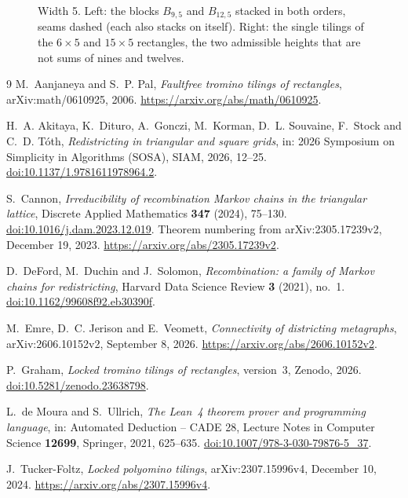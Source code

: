 \documentclass[11pt]{article}
\theoremstyle{definition}
\theoremstyle{remark}
\begin{document}
\begin{appendices}
\begin{figure}[ht]
\caption{Width 5. Left: the blocks $B_{9,5}$ and $B_{12,5}$ stacked in both
orders, seams dashed (each also stacks on itself). Right: the single tilings
of the $6\times5$ and $15\times5$ rectangles, the two admissible heights that are not
sums of nines and twelves.}
\label{fig:five}
\end{figure}

\end{appendices}
\clearpage

\begin{thebibliography}{9}
M.~Aanjaneya and S.~P. Pal,
\emph{Faultfree tromino tilings of rectangles},
arXiv:math/0610925, 2006.
\url{https://arxiv.org/abs/math/0610925}.

H.~A. Akitaya, K.~Dituro, A.~Gonczi, M.~Korman, D.~L. Souvaine, F.~Stock and
C.~D. T\'oth,
\emph{Redistricting in triangular and square grids},
in: 2026 Symposium on Simplicity in Algorithms (SOSA), SIAM, 2026, 12--25.
\href{https://doi.org/10.1137/1.9781611978964.2}{doi:10.1137/1.9781611978964.2}.

S.~Cannon,
\emph{Irreducibility of recombination Markov chains in the triangular lattice},
Discrete Applied Mathematics \textbf{347} (2024), 75--130.
\href{https://doi.org/10.1016/j.dam.2023.12.019}{doi:10.1016/j.dam.2023.12.019}.
Theorem numbering from arXiv:2305.17239v2, December 19, 2023.
\url{https://arxiv.org/abs/2305.17239v2}.

D.~DeFord, M.~Duchin and J.~Solomon,
\emph{Recombination: a family of Markov chains for redistricting},
Harvard Data Science Review \textbf{3} (2021), no.~1.
\href{https://doi.org/10.1162/99608f92.eb30390f}{doi:10.1162/99608f92.eb30390f}.

M.~Emre, D.~C. Jerison and E.~Veomett,
\emph{Connectivity of districting metagraphs},
arXiv:2606.10152v2, September 8, 2026.
\url{https://arxiv.org/abs/2606.10152v2}.

P.~Graham,
\emph{Locked tromino tilings of rectangles}, version~3,
Zenodo, 2026.
\href{https://doi.org/10.5281/zenodo.23638798}{doi:10.5281/zenodo.23638798}.

L.~de Moura and S.~Ullrich,
\emph{The Lean~4 theorem prover and programming language},
in: Automated Deduction -- CADE 28, Lecture Notes in Computer Science
\textbf{12699}, Springer, 2021, 625--635.
\href{https://doi.org/10.1007/978-3-030-79876-5_37}{doi:10.1007/978-3-030-79876-5\_37}.

J.~Tucker-Foltz,
\emph{Locked polyomino tilings},
arXiv:2307.15996v4, December 10, 2024.
\url{https://arxiv.org/abs/2307.15996v4}.
\end{thebibliography}
\end{document}
